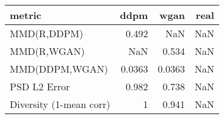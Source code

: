 \begin{tabular}{lrrr}
\toprule
metric & ddpm & wgan & real \\
\midrule
MMD(R,DDPM) & 0.492 & NaN & NaN \\
MMD(R,WGAN) & NaN & 0.534 & NaN \\
MMD(DDPM,WGAN) & 0.0363 & 0.0363 & NaN \\
PSD L2 Error & 0.982 & 0.738 & NaN \\
Diversity (1-mean corr) & 1 & 0.941 & NaN \\
\bottomrule
\end{tabular}
